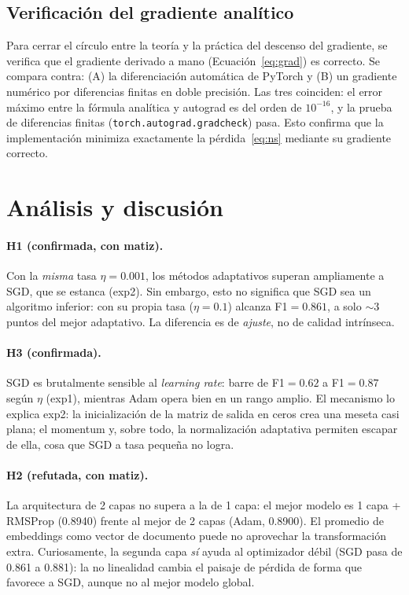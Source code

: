 \documentclass[11pt]{article}
\begin{document}
\subsection{Verificación del gradiente analítico}\label{sec:gradcheck}
Para cerrar el círculo entre la teoría y la práctica del descenso del gradiente, se verifica
que el gradiente derivado a mano (Ecuación~\eqref{eq:grad}) es correcto. Se compara contra:
(A) la diferenciación automática de PyTorch y (B) un gradiente numérico por diferencias
finitas en doble precisión. Las tres coinciden: el error máximo entre la fórmula analítica y
autograd es del orden de $10^{-16}$, y la prueba de diferencias finitas
(\texttt{torch.autograd.gradcheck}) pasa. Esto confirma que la implementación minimiza
exactamente la pérdida~\eqref{eq:ns} mediante su gradiente correcto.

\section{Análisis y discusión}\label{sec:analisis}

\paragraph{H1 (confirmada, con matiz).} Con la \emph{misma} tasa $\eta=0.001$, los métodos
adaptativos superan ampliamente a SGD, que se estanca (exp2). Sin embargo, esto no significa
que SGD sea un algoritmo inferior: con su propia tasa ($\eta=0.1$) alcanza F1$=0.861$, a solo
$\sim$3 puntos del mejor adaptativo. La diferencia es de \emph{ajuste}, no de calidad
intrínseca.

\paragraph{H3 (confirmada).} SGD es brutalmente sensible al \emph{learning rate}: barre de
F1$=0.62$ a F1$=0.87$ según $\eta$ (exp1), mientras Adam opera bien en un rango amplio. El
mecanismo lo explica exp2: la inicialización de la matriz de salida en ceros crea una meseta
casi plana; el momentum y, sobre todo, la normalización adaptativa permiten escapar de ella,
cosa que SGD a tasa pequeña no logra.

\paragraph{H2 (refutada, con matiz).} La arquitectura de 2 capas no supera a la de 1 capa: el
mejor modelo es 1 capa + RMSProp (0.8940) frente al mejor de 2 capas (Adam, 0.8900). El
promedio de embeddings como vector de documento puede no aprovechar la transformación extra.
Curiosamente, la segunda capa \emph{sí} ayuda al optimizador débil (SGD pasa de 0.861 a
0.881): la no linealidad cambia el paisaje de pérdida de forma que favorece a SGD, aunque no
al mejor modelo global.
\end{document}
